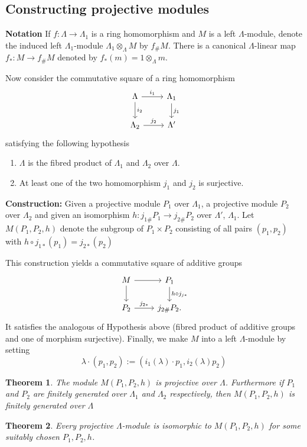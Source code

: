 \documentclass[11pt]{article}
\newtheorem{thm}{Theorem}[section]
\newcommand{\rta}{\rightarrow}
\newcommand{\lrta}{\longrightarrow}
\begin{document}
\subsection*{Constructing projective modules}
\textbf{Notation} If $f:\Lambda\lrta \Lambda_1$ is a ring homomorphism and $M$ is a left $\Lambda$-module, denote the induced left $\Lambda_1$-module $\Lambda_1\otimes_\Lambda M$ by $f_\# M$. There is a canonical $\Lambda$-linear map $f_*:M\lrta f_\# M$ denoted by $f_*(m)=1\otimes_\Lambda m$.

Now consider the commutative square of a ring homomorphism 
\[
\begin{tikzcd}
\Lambda\ar[r,"i_1"]\ar[d,"i_2"] & \Lambda_1 \ar[d,"j_1"]\\
\Lambda_2 \ar[r,"j_2"] & \Lambda'
\end{tikzcd}
\]
satisfying the following hypothesis
\begin{enumerate}
\item $\Lambda $ is the fibred product of $\Lambda_1$ and $\Lambda_2$ over $\Lambda$.
\item  At least one of the two homomorphism $j_1$ and $j_2$ is surjective.
\end{enumerate}	
\textbf{Construction:} Given a projective module $P_1$ over $\Lambda_1$, a projective module $P_2$ over $\Lambda_2$ and given an isomorphism $h:j_{1\#}P_1\rta j_{2\#}P_2$ over $\Lambda'$, $\Lambda_1$. Let $M(P_1,P_2,h)$ denote the subgroup of $P_1\times P_2$ consisting of all pairs $(p_1,p_2)$ with $h\circ j_{1*}(p_1)=j_{2*}(p_2)$


This construction yields a commutative square of additive groups 
\[
\begin{tikzcd}
M\ar[r]\ar[d] & P_1 \ar[d,"h\circ j_{j*}"]\\
P_2 \ar[r,"j_{2*}"] & j_{2\#}P_2.
\end{tikzcd}
\]
It satisfies the analogous of Hypothesis above (fibred product of additive groups and one of morphism surjective). Finally, we make $M$ into a left $\Lambda$-module by setting
$$
\lambda\cdot (p_1,p_2):=(i_1 (\lambda)\cdot p_1, i_{2}(\lambda)p_2)
$$

\begin{thm}\label{thm:construct_proj}
The module $M(P_1,P_2,h)$ is projective over $\Lambda$. Furthermore if $P_1$ and $P_2$ are finitely generated over $\Lambda_1$ and $\Lambda_2$ respectively, then $M(P_1,P_2,h)$ is finitely generated over $\Lambda$
\end{thm}

\begin{thm}\label{thm:construct_iso1}
 Every projective $\Lambda$-module is isomorphic to $M(P_1,P_2,h)$ for some suitably chosen $P_1,P_2,h$.
\end{thm}
\end{document}
